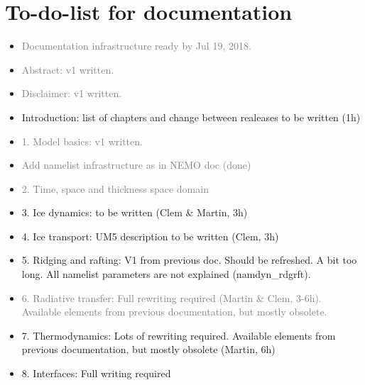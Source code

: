 \documentclass[../../tex_main/NEMO_manual]{subfiles}
\begin{document}

\chapter*{To-do-list for documentation}
\label{chap:TDL}

\begin{itemize}

\item \textcolor{gray}{Documentation infrastructure ready by Jul 19, 2018.}

\item \textcolor{gray}{Abstract: v1 written.}

\item \textcolor{gray}{Disclaimer: v1 written.}

\item Introduction: list of chapters and change between realeases to be written (1h)

\item \textcolor{gray}{1. Model basics: v1 written.}

\item \textcolor{gray}{Add namelist infrastructure as in NEMO doc (done)}

\item \textcolor{gray}{2. Time, space and thickness space domain}

\item 3. Ice dynamics: to be written (Clem \& Martin, 3h)

\item 4. Ice transport: UM5 description to be written (Clem, 3h)

\item 5. Ridging and rafting: V1 from previous doc. Should be refreshed. A bit too long. All namelist parameters are not explained (namdyn\_rdgrft).

\item \textcolor{gray}{6. Radiative transfer: Full rewriting required (Martin \& Clem, 3-6h). Available elements from previous documentation, but mostly obsolete.}

\item 7. Thermodynamics: Lots of rewriting required. Available elements from previous documentation, but mostly obsolete (Martin, 6h)

\item 8. Interfaces: Full writing required 


\end{itemize}
\end{document}
